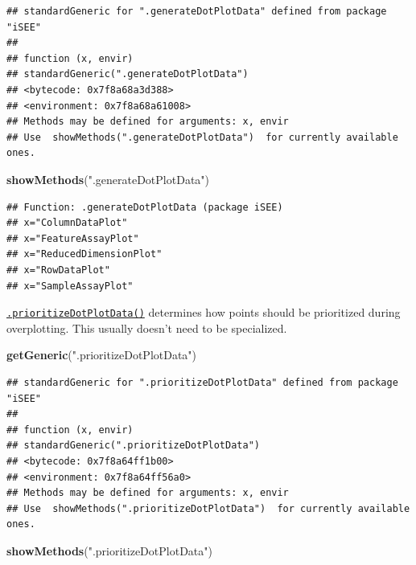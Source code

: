 \documentclass[
]{book}
\newenvironment{Shaded}{\begin{snugshade}}{\end{snugshade}}
\newcommand{\KeywordTok}[1]{\textcolor[rgb]{0.13,0.29,0.53}{\textbf{#1}}}
\newcommand{\NormalTok}[1]{#1}
\newcommand{\StringTok}[1]{\textcolor[rgb]{0.31,0.60,0.02}{#1}}
\begin{document}
\begin{verbatim}
## standardGeneric for ".generateDotPlotData" defined from package "iSEE"
## 
## function (x, envir) 
## standardGeneric(".generateDotPlotData")
## <bytecode: 0x7f8a68a3d388>
## <environment: 0x7f8a68a61008>
## Methods may be defined for arguments: x, envir
## Use  showMethods(".generateDotPlotData")  for currently available ones.
\end{verbatim}

\begin{Shaded}
\begin{Highlighting}[]
\KeywordTok{showMethods}\NormalTok{(}\StringTok{".generateDotPlotData"}\NormalTok{)}
\end{Highlighting}
\end{Shaded}

\begin{verbatim}
## Function: .generateDotPlotData (package iSEE)
## x="ColumnDataPlot"
## x="FeatureAssayPlot"
## x="ReducedDimensionPlot"
## x="RowDataPlot"
## x="SampleAssayPlot"
\end{verbatim}

\href{https://isee.github.io/iSEE/reference/plot-generics.html}{\texttt{.prioritizeDotPlotData()}} determines how points should be prioritized during overplotting.
This usually doesn't need to be specialized.

\begin{Shaded}
\begin{Highlighting}[]
\KeywordTok{getGeneric}\NormalTok{(}\StringTok{".prioritizeDotPlotData"}\NormalTok{)}
\end{Highlighting}
\end{Shaded}

\begin{verbatim}
## standardGeneric for ".prioritizeDotPlotData" defined from package "iSEE"
## 
## function (x, envir) 
## standardGeneric(".prioritizeDotPlotData")
## <bytecode: 0x7f8a64ff1b00>
## <environment: 0x7f8a64ff56a0>
## Methods may be defined for arguments: x, envir
## Use  showMethods(".prioritizeDotPlotData")  for currently available ones.
\end{verbatim}

\begin{Shaded}
\begin{Highlighting}[]
\KeywordTok{showMethods}\NormalTok{(}\StringTok{".prioritizeDotPlotData"}\NormalTok{)}
\end{Highlighting}
\end{Shaded}
\end{document}
